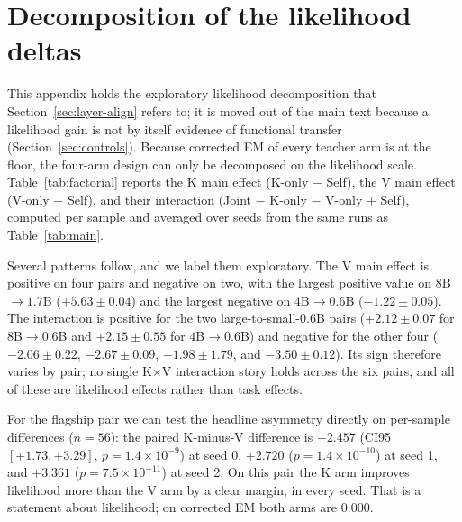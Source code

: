 \documentclass[11pt]{article}
\begin{document}
\appendix

\section{Decomposition of the likelihood deltas}
\label{app:factorial}
This appendix holds the exploratory likelihood decomposition that
Section~\ref{sec:layer-align} refers to; it is moved out of the main text
because a likelihood gain is not by itself evidence of functional transfer
(Section~\ref{sec:controls}). Because corrected EM of every teacher arm is at the
floor, the four-arm design can only be decomposed on the likelihood scale.
Table~\ref{tab:factorial} reports the K main effect (K-only $-$ Self), the V main
effect (V-only $-$ Self), and their interaction
(Joint $-$ K-only $-$ V-only $+$ Self), computed per sample and averaged over
seeds from the same runs as Table~\ref{tab:main}.

Several patterns follow, and we label them exploratory. The V main effect is
positive on four pairs and negative on two, with the largest positive value on
$8$B$\to1.7$B ($+5.63 \pm 0.04$) and the largest negative on $4$B$\to0.6$B
($-1.22 \pm 0.05$). The interaction is positive for the two large-to-small-$0.6$B
pairs ($+2.12 \pm 0.07$ for $8$B$\to0.6$B and $+2.15 \pm 0.55$ for
$4$B$\to0.6$B) and negative for the other four ($-2.06 \pm 0.22$,
$-2.67 \pm 0.09$, $-1.98 \pm 1.79$, and $-3.50 \pm 0.12$). Its sign therefore
varies by pair; no single K$\times$V interaction story holds across the six
pairs, and all of these are likelihood effects rather than task effects.

For the flagship pair we can test the headline asymmetry directly on per-sample
differences ($n=56$): the paired K-minus-V difference is $+2.457$
(CI95 $[+1.73, +3.29]$, $p=1.4\times10^{-9}$) at seed 0, $+2.720$
($p=1.4\times10^{-10}$) at seed 1, and $+3.361$ ($p=7.5\times10^{-11}$) at seed
2. On this pair the K arm improves likelihood more than the V arm by a clear
margin, in every seed. That is a statement about likelihood; on corrected EM both
arms are $0.000$.
\end{document}
